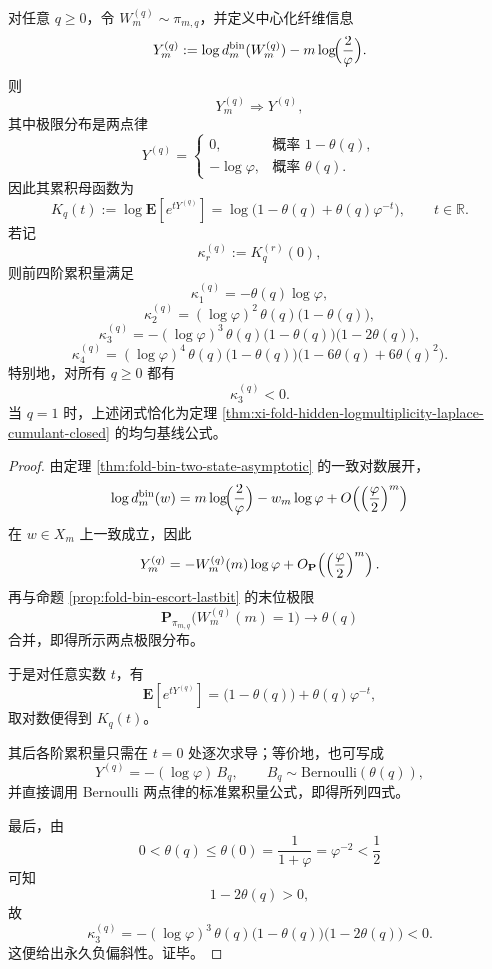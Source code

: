 \begin{theorem}\label{thm:xi-time-part9ob-escort-loginfo-cumulants-negative-skew}
对任意 \(q\ge 0\)，令 \(W_m^{(q)}\sim \pi_{m,q}\)，并定义中心化纤维信息
\[
Y_m^{(q)}
:=
\log d_m^{\mathrm{bin}}(W_m^{(q)})
-m\log\!\Bigl(\frac{2}{\varphi}\Bigr).
\]
则
\[
Y_m^{(q)}\Longrightarrow Y^{(q)},
\]
其中极限分布是两点律
\[
Y^{(q)}=
\begin{cases}
0,& \text{概率 }1-\theta(q),\\
-\log\varphi,& \text{概率 }\theta(q).
\end{cases}
\]
因此其累积母函数为
\[
K_q(t)
:=
\log \mathbf E\!\left[e^{tY^{(q)}}\right]
=
\log\!\bigl(1-\theta(q)+\theta(q)\varphi^{-t}\bigr),
\qquad t\in\mathbb R.
\]
若记
\[
\kappa_r^{(q)}:=K_q^{(r)}(0),
\]
则前四阶累积量满足
\[
\kappa_1^{(q)}=-\theta(q)\log\varphi,
\]
\[
\kappa_2^{(q)}=(\log\varphi)^2\,\theta(q)\bigl(1-\theta(q)\bigr),
\]
\[
\kappa_3^{(q)}=-(\log\varphi)^3\,\theta(q)\bigl(1-\theta(q)\bigr)\bigl(1-2\theta(q)\bigr),
\]
\[
\kappa_4^{(q)}=(\log\varphi)^4\,\theta(q)\bigl(1-\theta(q)\bigr)\bigl(1-6\theta(q)+6\theta(q)^2\bigr).
\]
特别地，对所有 \(q\ge 0\) 都有
\[
\kappa_3^{(q)}<0.
\]
当 \(q=1\) 时，上述闭式恰化为定理 \ref{thm:xi-fold-hidden-logmultiplicity-laplace-cumulant-closed} 的均匀基线公式。
\end{theorem}
\begin{proof}
由定理 \ref{thm:fold-bin-two-state-asymptotic} 的一致对数展开，
\[
\log d_m^{\mathrm{bin}}(w)
=
m\log\!\Bigl(\frac{2}{\varphi}\Bigr)-w_m\log\varphi
+O\!\left(\Bigl(\frac{\varphi}{2}\Bigr)^m\right)
\]
在 \(w\in X_m\) 上一致成立，因此
\[
Y_m^{(q)}
=
-W_m^{(q)}(m)\log\varphi
+O_{\mathbf P}\!\left(\Bigl(\frac{\varphi}{2}\Bigr)^m\right).
\]
再与命题 \ref{prop:fold-bin-escort-lastbit} 的末位极限
\[
\mathbf P_{\pi_{m,q}}\bigl(W_m^{(q)}(m)=1\bigr)\to \theta(q)
\]
合并，即得所示两点极限分布。

于是对任意实数 \(t\)，有
\[
\mathbf E\!\left[e^{tY^{(q)}}\right]
=
\bigl(1-\theta(q)\bigr)+\theta(q)\varphi^{-t},
\]
取对数便得到 \(K_q(t)\)。

其后各阶累积量只需在 \(t=0\) 处逐次求导；等价地，也可写成
\[
Y^{(q)}=-(\log\varphi)\,B_q,
\qquad
B_q\sim \mathrm{Bernoulli}(\theta(q)),
\]
并直接调用 Bernoulli 两点律的标准累积量公式，即得所列四式。

最后，由
\[
0<\theta(q)\le \theta(0)=\frac{1}{1+\varphi}=\varphi^{-2}<\frac12
\]
可知
\[
1-2\theta(q)>0,
\]
故
\[
\kappa_3^{(q)}
=
-(\log\varphi)^3\,\theta(q)\bigl(1-\theta(q)\bigr)\bigl(1-2\theta(q)\bigr)<0.
\]
这便给出永久负偏斜性。证毕。
\end{proof}

\endinput
